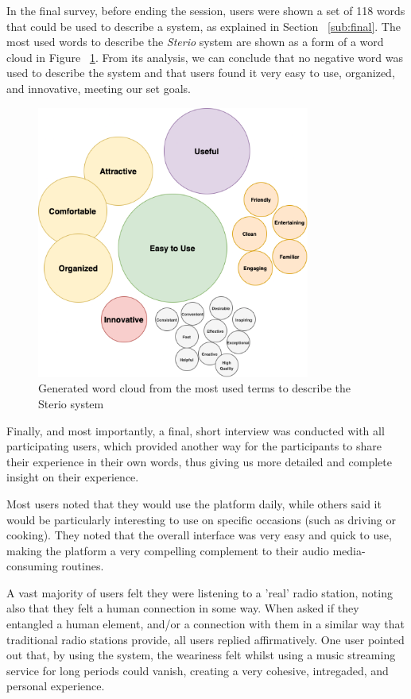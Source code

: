 {In the final survey, before ending the session, users were shown a set of 118 words that could be used to describe a system, as explained in Section ~\ref{sub:final}. The most used words to describe the \textit{Sterio} system are shown as a form of a word cloud in Figure ~\ref{fig:wordcloud}. From its analysis, we can conclude that no negative word was used to describe the system and that users found it very easy to use, organized, and innovative, meeting our set goals.


\begin{figure}[h]
\centering
\includegraphics[width=0.8\textwidth]{./Images/wordcloud.png}
\caption{Generated word cloud from the most used terms to describe the Sterio system}
\label{fig:wordcloud}
\end{figure}

Finally, and most importantly, a final, short interview was conducted with all participating users, which provided another way for the participants to share their experience in their own words, thus giving us more detailed and complete insight on their experience.

Most users noted that they would use the platform daily, while others said it would be particularly interesting to use on specific occasions (such as driving or cooking). They noted that the overall interface was very easy and quick to use, making the platform a very compelling complement to their audio media-consuming routines. 

A vast majority of users felt they were listening to a 'real' radio station, noting also that they felt a human connection in some way. When asked if they entangled a human element, and/or a connection with them in a similar way that traditional radio stations provide, all users replied affirmatively. One user pointed out that, by using the system, the weariness felt whilst using a music streaming service for long periods could vanish, creating a very cohesive, intregaded, and personal experience. 

}

